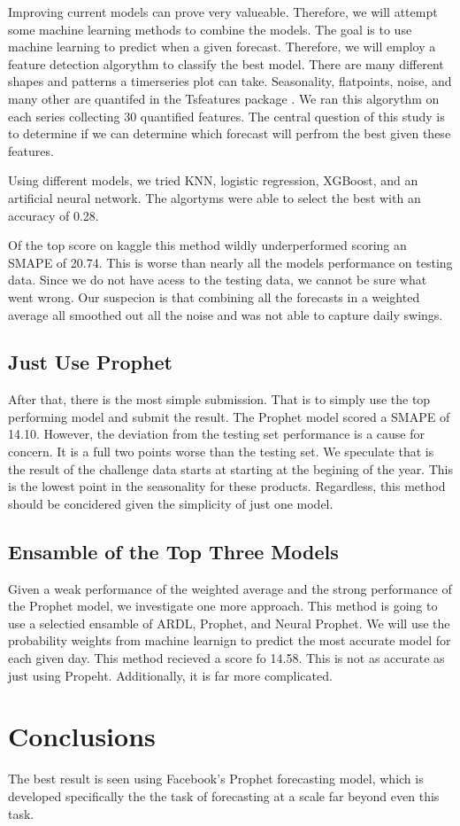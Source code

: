 \documentclass[16pt,twocolumn,letterpaper]{article}
\begin{document}
Improving current models can prove very valueable. Therefore, we will attempt some machine learning methods to combine the models. The goal is to use machine learning to predict when a given forecast. Therefore, we will employ a feature detection algorythm to classify the best model. There are many different shapes and patterns a timerseries plot can take. Seasonality, flatpoints, noise, and many other are quantifed in the Tsfeatures package \cite{montero2020fforma}. We ran this algorythm on each series collecting 30 quantified features. The central question of this study is to determine if we can determine which forecast will perfrom the best given these features. 

Using different models, we tried KNN, logistic regression, XGBoost, and an artificial neural network. The algortyms were able to select the best with an accuracy of 0.28.

Of the top score on kaggle this method wildly underperformed scoring an SMAPE of 20.74. This is worse than nearly all the models performance on testing data. Since we do not have acess to the testing data, we cannot be sure what went wrong. Our suspecion is that combining all the forecasts in a weighted average all smoothed out all the noise and was not able to capture daily swings.

\subsection{Just Use Prophet}

After that, there is the most simple submission. That is to simply use the top performing model and submit the result. The Prophet model scored a SMAPE of 14.10. However, the deviation from the testing set performance is a cause for concern. It is a full two points worse than the testing set. We speculate that is the result of the challenge data starts at starting at the begining of the year. This is the lowest point in the seasonality for these products. Regardless, this method should be concidered given the simplicity of just one model. 

\subsection{Ensamble of the Top Three Models}

Given a weak performance of the weighted average and the strong performance of the Prophet model, we investigate one more approach. This method is going to use a selectied ensamble of ARDL, Prophet, and Neural Prophet. We will use the probability weights from machine learnign to predict the most accurate model for each given day. This method recieved a score fo 14.58. This is not as accurate as just using Propeht. Additionally, it is far more complicated. 

\section{Conclusions}

The best result is seen using Facebook's Prophet forecasting model, which is developed specifically the the task of forecasting at a scale far beyond even this task. 


\clearpage
\onecolumn


\end{document}
